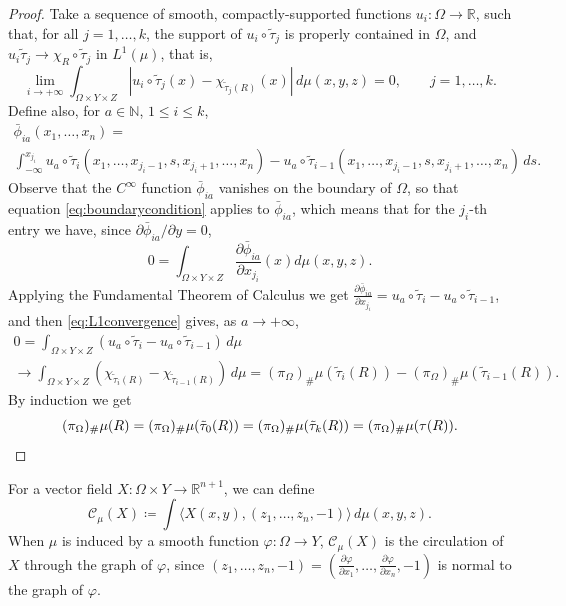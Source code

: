 \documentclass{article}
\newcommand{\R}{\mathbb{R}}
\theoremstyle{definition}
\theoremstyle{remark}
\newcommand{\proj}{\pi}
\newcommand{\projX}{\proj_{\Omega}}
\begin{document}
\begin{proof}
 Take a sequence of smooth, compactly-supported functions $u_{i}\colon \Omega\to \R$, such that, for all $j=1,\dots,k$, the support of $u_{i}\circ\tilde\tau_j$ is properly contained in $\Omega$, and  $u_{i}\tilde\tau_j\to \chi_{R}\circ\tilde\tau_j$ in $L^1(\mu)$, that is, 
 \begin{equation}\label{eq:L1convergence}
  \lim_{i\to+\infty}\int_{\Omega\times Y\times Z} |u_{i}\circ\tilde\tau_j(x)-\chi_{\tilde\tau_j(R)}(x)|\,d\mu(x,y,z)=0,\qquad j=1,\dots,k.
 \end{equation}
 Define also, for $a\in\mathbb N$, $1\leq i\leq k$,
 \begin{multline*}
  \bar\phi_{ia}(x_1,\dots,x_n)=\\
  \int_{-\infty}^{x_{j_i}}u_{a}\circ\tilde\tau_i(x_1,\dots,x_{j_i-1},s,x_{j_i+1},\dots,x_n)-u_{a}\circ\tilde\tau_{i-1}(x_1,\dots,x_{j_i-1},s,x_{j_i+1},\dots,x_n)\,ds.
 \end{multline*}
%
 Observe that the $C^\infty$ function $\bar\phi_{ia}$ vanishes on the boundary of $\Omega$, so that equation \eqref{eq:boundarycondition} applies to $\bar\phi_{ia}$, which means that for the $j_i$-th entry we have, since $\partial\bar\phi_{ia}/\partial y=0$,
 \begin{equation*}
   0=\int_{\Omega\times Y\times Z}\frac{\partial\bar\phi_{ia}}{\partial x_{j_i}}(x)d\mu(x,y,z).
   \end{equation*}
  Applying the Fundamental Theorem of Calculus we get $\frac{\partial\bar\phi_{ia}}{\partial x_{j_i}}=u_a\circ\tilde\tau_i-u_a\circ\tilde\tau_{i-1}$, and then \eqref{eq:L1convergence} gives, as $a\to+\infty$, 
   \begin{multline*}
   0=\int_{\Omega\times Y\times Z}(u_{a}\circ\tilde\tau_i-u_{a}\circ\tilde\tau_{i-1})\,d\mu\\
   \to \int_{\Omega\times Y\times Z}(\chi_{\tilde\tau_i(R)}-\chi_{\tilde\tau_{i-1}(R)})\,d\mu
   =(\projX)_{\#}\mu(\tilde\tau_i(R))-(\projX)_{\#}\mu(\tilde\tau_{i-1}(R)).
 \end{multline*}
%
%
%
%
%
%
 By induction we get
 \[(\projX{})_{\#}\mu(R)=(\projX{})_{\#}\mu(\tilde\tau_{0}(R))=(\projX{})_{\#}\mu(\tilde\tau_{k}(R))=(\projX{})_{\#}\mu(\tau(R)).\qedhere\]
 \end{proof}
 
%
%
%
%
%
%
%
%
%
%
%
%
%
%

For a vector field $X\colon \Omega\times Y\to\R^{n+1}$, we can define
\begin{equation}\label{eq:defmuX}
{\mathcal C_\mu}(X)\coloneqq\int \langle X(x,y), 
 ( z_1,\dots,z_n,-1)\rangle\, d\mu(x,y,z).
\end{equation}
When $\mu$ is induced by a smooth function $\varphi\colon \Omega\to Y$, ${\mathcal C_\mu}(X)$ is the circulation of $X$ through the graph of $\varphi$, since $(z_1,\dots,z_n,-1)=(\frac{\partial\varphi}{\partial x_1},\dots,\frac{\partial\varphi}{\partial x_n},-1)$ is normal to the graph of $\varphi$. 
\end{document}
